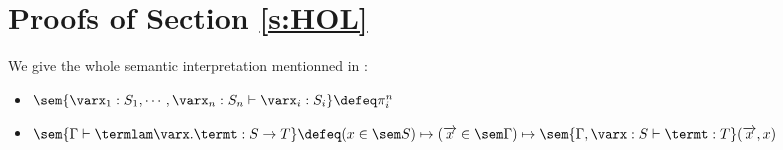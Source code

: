 
\section{Proofs of Section \ref{s:HOL}}

\label{app:hol_semantic}

\begingroup
{}

\begin{definition}

We give the whole semantic interpretation mentionned in :
\begin{itemize}
  \item $\sem{\varx_1 : S_1,\cdots , \varx_n : S_n\vdash \varx_i : S_i} \defeq \pi_i^n$
  \item $\sem{\Gamma \vdash \termlam \varx.\termt : S \to T} \defeq%
     (x \in \sem S) \mapsto (\overrightarrow{x} \in \sem \Gamma) \mapsto \sem{\Gamma, \varx : S\vdash \termt : T}(\overrightarrow{x},x)$


\end{itemize}
\end{definition}
